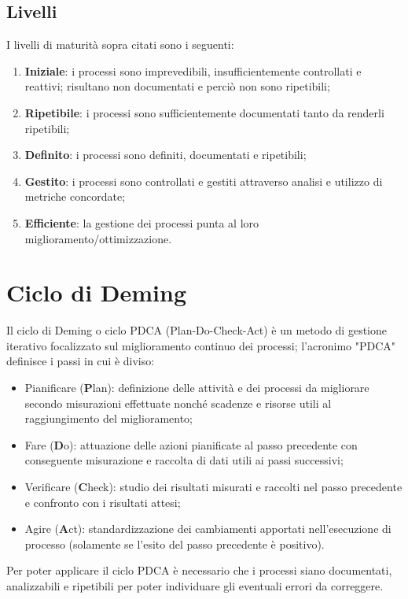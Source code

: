 \documentclass[../PianoDiQualifica.tex]{subfiles}
\begin{document}
		\subsection{Livelli}
			I livelli di maturità sopra citati sono i seguenti:
			\begin{enumerate}
				\item \textbf{Iniziale}: i processi sono imprevedibili, insufficientemente controllati
				e reattivi; risultano non documentati e perciò non sono ripetibili;
				\item \textbf{Ripetibile}: i processi sono sufficientemente documentati tanto da
				renderli ripetibili;
				\item \textbf{Definito}: i processi sono definiti, documentati e ripetibili;
				\item \textbf{Gestito}: i processi sono controllati e gestiti attraverso analisi e
				utilizzo di metriche concordate;
				\item \textbf{Efficiente}: la gestione dei processi punta al loro
				miglioramento/ottimizzazione.
			\end{enumerate}
	\section{Ciclo di Deming}\label{app:PDCA}
		Il ciclo di Deming o ciclo PDCA (Plan-Do-Check-Act) è un metodo di gestione iterativo
		focalizzato sul miglioramento continuo dei processi; l'acronimo "PDCA" definisce i passi
		in cui è diviso:
		\begin{itemize}
			\item Pianificare (\textbf{P}lan): definizione delle attività e dei processi da migliorare
			secondo misurazioni effettuate nonché scadenze e risorse utili al raggiungimento del
			miglioramento;
			\item Fare (\textbf{D}o): attuazione delle azioni pianificate al passo precedente con
			conseguente misurazione e raccolta di dati utili ai passi successivi;
			\item Verificare (\textbf{C}heck): studio dei risultati misurati e raccolti nel passo
			precedente e confronto con i risultati attesi;
			\item Agire (\textbf{A}ct): standardizzazione dei cambiamenti apportati nell'esecuzione
			di processo (solamente se l'esito del passo precedente è positivo).
		\end{itemize}
		Per poter applicare il ciclo PDCA è necessario che i processi siano documentati,
		analizzabili e ripetibili per poter individuare gli eventuali errori da correggere.
\end{document}
